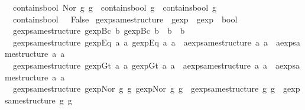 \begin{isabellebody}
\ \ {\isachardoublequoteopen}contains{\isacharunderscore}bool\ {\isacharparenleft}Nor\ g{}\ g{}{\isacharparenright}\ {\isacharequal}\ {\isacharparenleft}contains{\isacharunderscore}bool\ g{}\ {\isasymor}\ contains{\isacharunderscore}bool\ g{}{\isacharparenright}{\isachardoublequoteclose}\ {\isacharbar}\isanewline
\ \ {\isachardoublequoteopen}contains{\isacharunderscore}bool\ {\isacharunderscore}\ {\isacharequal}\ False{\isachardoublequoteclose}\isanewline
\isanewline
{}\isamarkupfalse%
\ gexp{\isacharunderscore}same{\isacharunderscore}structure\ {\isacharcolon}{\isacharcolon}\ {\isachardoublequoteopen}gexp\ {\isasymRightarrow}\ gexp\ {\isasymRightarrow}\ bool{\isachardoublequoteclose}\ \isanewline
\ \ {\isachardoublequoteopen}gexp{\isacharunderscore}same{\isacharunderscore}structure\ {\isacharparenleft}gexp{\isachardot}Bc\ b{\isacharparenright}\ {\isacharparenleft}gexp{\isachardot}Bc\ b{\isacharprime}{\isacharparenright}\ {\isacharequal}\ {\isacharparenleft}b\ {\isacharequal}\ b{\isacharprime}{\isacharparenright}{\isachardoublequoteclose}\ {\isacharbar}\isanewline
\ \ {\isachardoublequoteopen}gexp{\isacharunderscore}same{\isacharunderscore}structure\ {\isacharparenleft}gexp{\isachardot}Eq\ a{}\ a{}{\isacharparenright}\ {\isacharparenleft}gexp{\isachardot}Eq\ a{}{\isacharprime}\ a{}{\isacharprime}{\isacharparenright}\ {\isacharequal}\ {\isacharparenleft}aexp{\isacharunderscore}same{\isacharunderscore}structure\ a{}\ a{}{\isacharprime}\ {\isasymand}\ aexp{\isacharunderscore}same{\isacharunderscore}structure\ a{}\ a{}{\isacharprime}{\isacharparenright}{\isachardoublequoteclose}\ {\isacharbar}\isanewline
\ \ {\isachardoublequoteopen}gexp{\isacharunderscore}same{\isacharunderscore}structure\ {\isacharparenleft}gexp{\isachardot}Gt\ a{}\ a{}{\isacharparenright}\ {\isacharparenleft}gexp{\isachardot}Gt\ a{}{\isacharprime}\ a{}{\isacharprime}{\isacharparenright}\ {\isacharequal}\ {\isacharparenleft}aexp{\isacharunderscore}same{\isacharunderscore}structure\ a{}\ a{}{\isacharprime}\ {\isasymand}\ aexp{\isacharunderscore}same{\isacharunderscore}structure\ a{}\ a{}{\isacharprime}{\isacharparenright}{\isachardoublequoteclose}\ {\isacharbar}\isanewline
\ \ {\isachardoublequoteopen}gexp{\isacharunderscore}same{\isacharunderscore}structure\ {\isacharparenleft}gexp{\isachardot}Nor\ g{}\ g{}{\isacharparenright}\ {\isacharparenleft}gexp{\isachardot}Nor\ g{}{\isacharprime}\ g{}{\isacharprime}{\isacharparenright}\ {\isacharequal}\ {\isacharparenleft}gexp{\isacharunderscore}same{\isacharunderscore}structure\ g{}\ g{}{\isacharprime}\ {\isasymand}\ gexp{\isacharunderscore}same{\isacharunderscore}structure\ g{}\ g{}{\isacharprime}{\isacharparenright}{\isachardoublequoteclose}\ {\isacharbar}\isanewline

\end{isabellebody}
